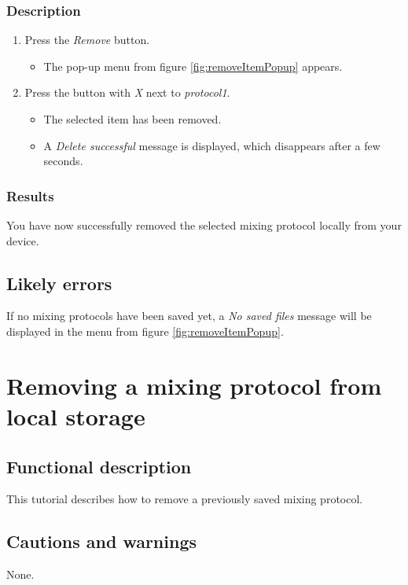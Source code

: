 \subsubsection{Description}
\begin{enumerate}
	\item Press the \emph{Remove} button.
		\begin{itemize}
			\item The pop-up menu from figure \ref{fig:removeItemPopup} appears.
		\end{itemize}
	\item Press the button with \emph{X} next to \emph{protocol1}.
		\begin{itemize}
			\item The selected item has been removed.
			\item A \emph{Delete successful} message is displayed, which disappears after a few seconds.
		\end{itemize}
\end{enumerate}

\subsubsection{Results}
You have now successfully removed the selected mixing protocol locally from your device.

\subsection{Likely errors}
If no mixing protocols have been saved yet, a \emph{No saved files} message will be displayed in the menu from figure \ref{fig:removeItemPopup}.

\section{Removing a mixing protocol from local storage}\label{sec:remmixrun}

\subsection{Functional description}
This tutorial describes how to remove a previously saved mixing protocol.

\subsection{Cautions and warnings}
None.

